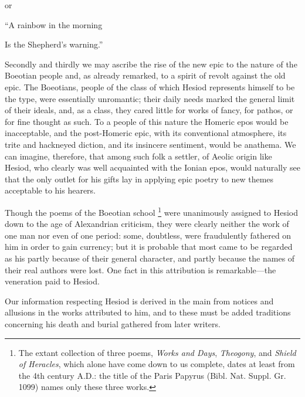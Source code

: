 or

“A rainbow in the morning

Is the Shepherd’s warning.”

Secondly and thirdly we may ascribe the rise of the new epic to the nature of
the Boeotian people and, as already remarked, to a spirit of revolt against the
old epic. The Boeotians, people of the class of which Hesiod represents himself
to be the type, were essentially unromantic; their daily needs marked the
general limit of their ideals, and, as a class, they cared little for works of
fancy, for pathos, or for fine thought as such. To a people of this nature the
Homeric epos would be inacceptable, and the post-Homeric epic, with its
conventional atmosphere, its trite and hackneyed diction, and its insincere
sentiment, would be anathema. We can imagine, therefore, that among such folk a
settler, of Aeolic origin like Hesiod, who clearly was well acquainted with the
Ionian epos, would naturally see that the only outlet for his gifts lay in
applying epic poetry to new themes acceptable to his hearers.

Though the poems of the Boeotian school \footnote{The extant collection of
three poems, \emph{Works and Days}, \emph{Theogony}, and \emph{Shield of
Heracles}, which alone have come down to us complete, dates at least from
the 4th century A.D.: the title of the Paris Papyrus (Bibl. Nat. Suppl. Gr.
1099) names only these three works.} were
unanimously assigned to Hesiod down to the age of Alexandrian criticism, they
were clearly neither the work of one man nor even of one period: some,
doubtless, were fraudulently fathered on him in order to gain currency; but it
is probable that most came to be regarded as his partly because of their
general character, and partly because the names of their real authors were
lost. One fact in this attribution is remarkable—the veneration paid to
Hesiod.


Our information respecting Hesiod is derived in the main from notices and
allusions in the works attributed to him, and to these must be added traditions
concerning his death and burial gathered from later writers.

